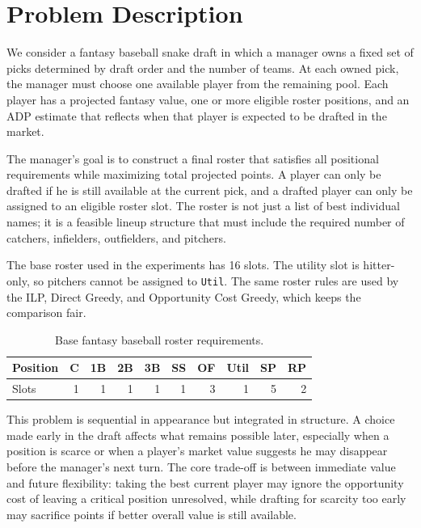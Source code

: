\documentclass[10pt,a4paper]{article}
\begin{document}
\section{Problem Description}

We consider a fantasy baseball snake draft in which a manager owns a fixed set of picks determined by draft order and the number of teams. At each owned pick, the manager must choose one available player from the remaining pool. Each player has a projected fantasy value, one or more eligible roster positions, and an ADP estimate that reflects when that player is expected to be drafted in the market.

The manager's goal is to construct a final roster that satisfies all positional requirements while maximizing total projected points. A player can only be drafted if he is still available at the current pick, and a drafted player can only be assigned to an eligible roster slot. The roster is not just a list of best individual names; it is a feasible lineup structure that must include the required number of catchers, infielders, outfielders, and pitchers.

The base roster used in the experiments has 16 slots. The utility slot is hitter-only, so pitchers cannot be assigned to \texttt{Util}. The same roster rules are used by the ILP, Direct Greedy, and Opportunity Cost Greedy, which keeps the comparison fair.

\begin{table}[H]
\centering
\small
\caption{Base fantasy baseball roster requirements.}
\label{tab:roster}
\begin{tabular}{lrrrrrrrrr}
\toprule
Position & C & 1B & 2B & 3B & SS & OF & Util & SP & RP \\
\midrule
Slots & 1 & 1 & 1 & 1 & 1 & 3 & 1 & 5 & 2 \\
\bottomrule
\end{tabular}
\end{table}

This problem is sequential in appearance but integrated in structure. A choice made early in the draft affects what remains possible later, especially when a position is scarce or when a player's market value suggests he may disappear before the manager's next turn. The core trade-off is between immediate value and future flexibility: taking the best current player may ignore the opportunity cost of leaving a critical position unresolved, while drafting for scarcity too early may sacrifice points if better overall value is still available.
\end{document}
